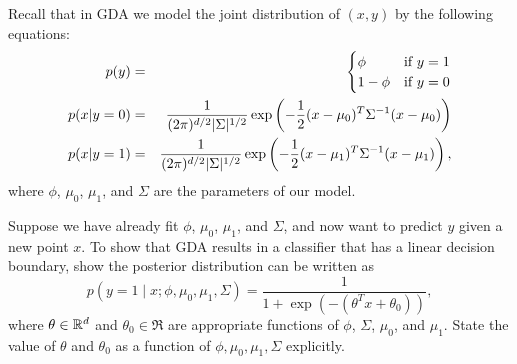 \item {}
Recall that in GDA we model the joint distribution of $(x, y)$ by the following
equations:
%
\begin{eqnarray*}
	p(y) &=& \begin{cases}
	\phi & \mbox{if~} y = 1 \\
	1 - \phi & \mbox{if~} y = 0 \end{cases} \\
	p(x | y=0) &=& \frac{1}{(2\pi)^{{d}/2} |\Sigma|^{1/2}}
		\exp\left(-\frac{1}{2}(x-\mu_{0})^T \Sigma^{-1} (x-\mu_{0})\right) \\
	p(x | y=1) &=& \frac{1}{(2\pi)^{{d}/2} |\Sigma|^{1/2}}
		\exp\left(-\frac{1}{2}(x-\mu_1)^T \Sigma^{-1} (x-\mu_1) \right),
\end{eqnarray*}
%
where $\phi$, $\mu_0$, $\mu_1$, and $\Sigma$ are the parameters of our model.

Suppose we have already fit $\phi$, $\mu_0$, $\mu_1$, and $\Sigma$, and now
want to predict $y$ given a new point $x$. To show that GDA results in a
classifier that has a linear decision boundary, show the posterior distribution
can be written as
%
\begin{equation*}
	p(y = 1\mid x; \phi, \mu_0, \mu_1, \Sigma)
	= \frac{1}{1 + \exp(-(\theta^T x + \theta_0))},
\end{equation*}
%
where $\theta\in{\mathbb R}^{d}$ and $\theta_{0}\in\Re$ are appropriate functions of
$\phi$, $\Sigma$, $\mu_0$, and $\mu_1$. State the value of $\theta$ and $\theta_0$ as a function of $\phi, \mu_0, \mu_1, \Sigma$ explicitly.

